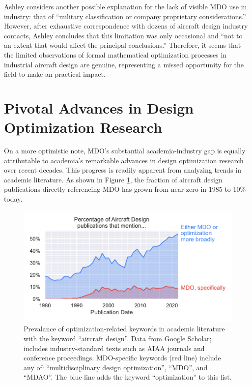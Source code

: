 \documentclass[12pt,vi,oneside,table]{report}
\begin{document}
    Ashley considers another possible explanation for the lack of visible MDO use in industry: that of ``military classification or company proprietary considerations.'' \cite{ashley_making_1982} However, after exhaustive correspondence with dozens of aircraft design industry contacts, Ashley concludes that this limitation was only occasional and ``not to an extent that would affect the principal conclusions.'' Therefore, it seems that the limited observations of formal mathematical optimization processes in industrial aircraft design are genuine, representing a missed opportunity for the field to make an practical impact.


    \section{Pivotal Advances in Design Optimization Research}
    \label{sec:literature_advances}

    On a more optimistic note, MDO's substantial academia-industry gap is equally attributable to academia's remarkable advances in design optimization research over recent decades. This progress is readily apparent from analyzing trends in academic literature. As shown in Figure \ref{fig:mdo_citation_counts}, the fraction of aircraft design publications directly referencing MDO has grown from near-zero in 1985 to 10\% today.

    \begin{figure}[htbp!]
        \centering
        \includegraphics{../figures/mdo_citation_counts}
        \caption{Prevalance of optimization-related keywords in academic literature with the keyword ``aircraft design''. Data from Google Scholar; includes industry-standard texts such as AIAA journals and conference proceedings. MDO-specific keywords (red line) include any of: ``multidisciplinary design optimization'', ``MDO'', and ``MDAO''. The blue line adds the keyword ``optimization'' to this list.}
        \label{fig:mdo_citation_counts}
    \end{figure}
\end{document}
